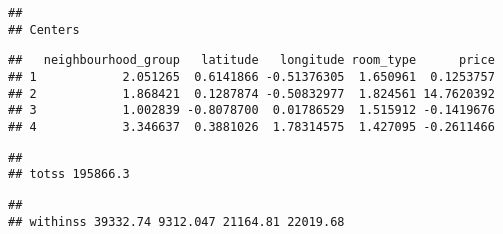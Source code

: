 \documentclass[
]{article}
\newenvironment{Shaded}{\begin{snugshade}}{\end{snugshade}}
\newcommand{\CharTok}[1]{\textcolor[rgb]{0.31,0.60,0.02}{#1}}
\newcommand{\KeywordTok}[1]{\textcolor[rgb]{0.13,0.29,0.53}{\textbf{#1}}}
\newcommand{\NormalTok}[1]{#1}
\newcommand{\OperatorTok}[1]{\textcolor[rgb]{0.81,0.36,0.00}{\textbf{#1}}}
\newcommand{\StringTok}[1]{\textcolor[rgb]{0.31,0.60,0.02}{#1}}
\begin{document}
\begin{verbatim}
## 
## Centers
\end{verbatim}

\begin{Shaded}
\end{Shaded}

\begin{verbatim}
##   neighbourhood_group   latitude   longitude room_type      price
## 1            2.051265  0.6141866 -0.51376305  1.650961  0.1253757
## 2            1.868421  0.1287874 -0.50832977  1.824561 14.7620392
## 3            1.002839 -0.8078700  0.01786529  1.515912 -0.1419676
## 4            3.346637  0.3881026  1.78314575  1.427095 -0.2611466
\end{verbatim}

\begin{Shaded}
\end{Shaded}

\begin{verbatim}
## 
## totss 195866.3
\end{verbatim}

\begin{Shaded}
\end{Shaded}

\begin{verbatim}
## 
## withinss 39332.74 9312.047 21164.81 22019.68
\end{verbatim}

\begin{Shaded}
\end{Shaded}
\end{document}
